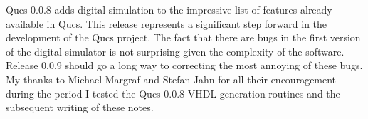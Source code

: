
Qucs 0.0.8 adds digital simulation to the impressive list of features
already available in Qucs.  This release represents a significant step
forward in the development of the Qucs project.  The fact that there
are bugs in the first version of the digital simulator is not
surprising given the complexity of the software.  Release 0.0.9 should
go a long way to correcting the most annoying of these bugs.  My
thanks to Michael Margraf and Stefan Jahn for all their encouragement
during the period I tested the Qucs 0.0.8 VHDL generation routines and
the subsequent writing of these notes.
